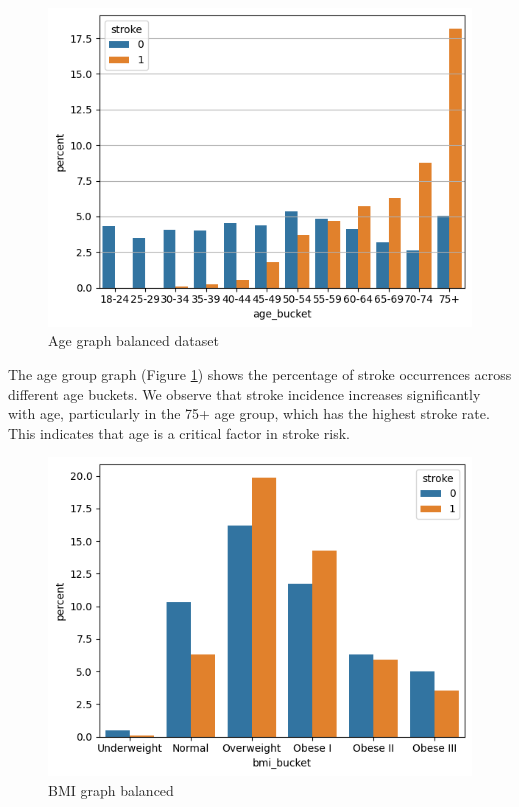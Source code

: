 \documentclass[twocolumn, 9pt]{extarticle}
\begin{document}
\begin{figure}[h]
\centering
\includegraphics[scale=0.4]{images/age_graph.png}
\caption{Age graph balanced dataset}
\label{fig:age_balanced}
\end{figure}

The age group graph (Figure \ref{fig:age_balanced}) shows the percentage of stroke occurrences across different age buckets. We observe that stroke incidence increases significantly with age, particularly in the 75+ age group, which has the highest stroke rate. This indicates that age is a critical factor in stroke risk.

\begin{figure}[h]
\centering
\includegraphics[scale=0.4]{images/bmi_graph.png}
\caption{BMI graph balanced}
\label{fig:bmi_balanced}
\end{figure}
\end{document}
